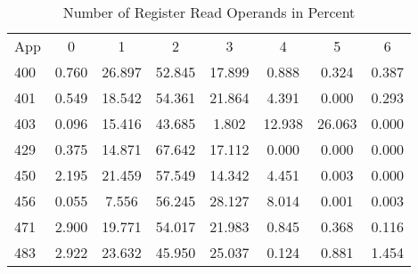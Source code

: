 \begin{Solution}
\begin{table}[H]
    \centering
    \caption{Number of Register Read Operands in Percent}
    \label{tab:pD:num_rr_operands}
    \begin{tabular}{| l | c | c | c | c | c | c | c |}
        \hline
        \multirow{2}{*}{App} & \multirow{2}{*}{0} & \multirow{2}{*}{1} & \multirow{2}{*}{2} & \multirow{2}{*}{3} & \multirow{2}{*}{4} & \multirow{2}{*}{5} & \multirow{2}{*}{6} \\
        & & & & & & & \\
        \hline
        400 & 0.760 & 26.897 & 52.845 & 17.899 & 0.888 & 0.324 & 0.387 \\
        \hline
        401 & 0.549 & 18.542 & 54.361 & 21.864 & 4.391 & 0.000 & 0.293 \\
        \hline
        403 & 0.096 & 15.416 & 43.685 & 1.802 & 12.938 & 26.063 & 0.000 \\
        \hline
        429 & 0.375 & 14.871 & 67.642 & 17.112 & 0.000 & 0.000 & 0.000 \\
        \hline
        450 & 2.195 & 21.459 & 57.549 & 14.342 & 4.451 & 0.003 & 0.000 \\
        \hline
        456 & 0.055 & 7.556 & 56.245 & 28.127 & 8.014 & 0.001 & 0.003 \\
        \hline
        471 & 2.900 & 19.771 & 54.017 & 21.983 & 0.845 & 0.368 & 0.116 \\
        \hline
        483 & 2.922 & 23.632 & 45.950 & 25.037 & 0.124 & 0.881 & 1.454 \\
        \hline
    \end{tabular}
\end{table}


\end{Solution}
